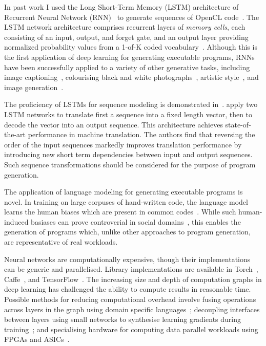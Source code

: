 In past work I used the Long Short-Term Memory (LSTM) architecture of Recurrent Neural Network (RNN)~\cite{Sundermeyer2012,Mikolov2015} to generate sequences of OpenCL code~\cite{Cummins2017a}. The LSTM network architecture comprises recurrent layers of \emph{memory cells}, each consisting of an input, output, and forget gate, and an output layer providing normalized probability values from a 1-of-K coded vocabulary~\cite{Graves,Graves2013}. Although this is the first application of deep learning for generating executable programs, RNNs have been successfully applied to a variety of other generative tasks, including image captioning~\cite{Vinyals}, colourising black and white photographs~\cite{Zhang2016}, artistic style~\cite{Gatys2015}, and image generation~\cite{Gregor2014}.

The proficiency of LSTMs for sequence modeling is demonstrated in~\cite{Sutskever2014}. \citeauthor{Sutskever2014} apply two LSTM networks to translate first a sequence into a fixed length vector, then to decode the vector into an output sequence. This architecture achieves state-of-the-art performance in machine translation. The authors find that reversing the order of the input sequences markedly improves translation performance by introducing new short term dependencies between input and output sequences. Such sequence transformations should be considered for the purpose of program generation.

The application of language modeling for generating executable programs is novel. In training on large corpuses of hand-written code, the language model learns the human biases which are present in common codes~\cite{Caliskan-islam2016}. While such human-induced basiases can prove controverial in social domains~\cite{Bolukbasi2016,Joseph2017}, this enables the generation of programs which, unlike other approaches to program generation, are representative of real workloads.

Neural networks are computationally expensive, though their implementations can be generic and parallelised. Library implementations are available in Torch~\cite{Collobert2011}, Caffe~\cite{Jia2014}, and TensorFlow~\cite{Abadi}. The increasing size and depth of computation graphs in deep learning has challenged the ability to compute results in reasonable time. Possible methods for reducing computational overhead involve fusing operations across layers in the graph using domain specific languages~\cite{Truong2016,Ashari2015a,Potter2015}; decoupling interfaces between layers using small networks to synthesise learning gradients during training~\cite{Jaderberg2016a}; and specialising hardware for computing data parallel workloads using FPGAs and ASICs~\cite{Misra2010}.


